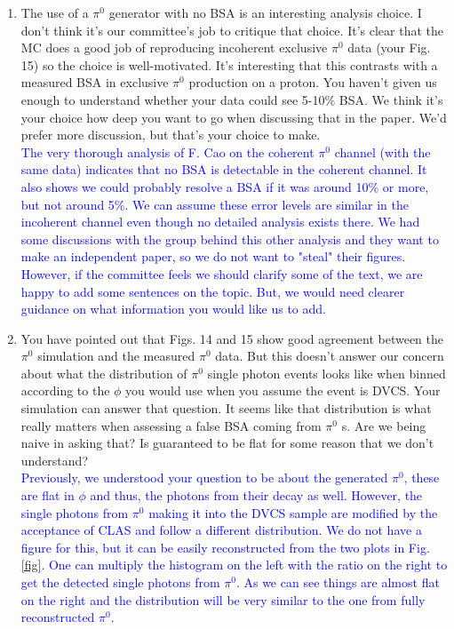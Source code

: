 \documentclass[a4paper,11pt,twoside]{article}
\begin{document}
\begin{enumerate}
\item The use of a $\pi^0$ generator with no BSA is an interesting analysis choice. I don't think it's our committee's job
to critique that choice. It's clear that the MC does a good job of reproducing incoherent exclusive $\pi^0$ data
(your Fig. 15) so the choice is well-motivated. It's interesting that this contrasts with a measured BSA in
exclusive $\pi^0$ production on a proton. You haven't given us enough to understand whether your data could
see 5-10\% BSA. We think it's your choice how deep you want to go when discussing that in the paper. We'd
prefer more discussion, but that's your choice to make. \\
   \textcolor{blue}{The very thorough analysis of F. Cao on the coherent $\pi^0$ channel (with the same data) indicates that no BSA is detectable in the coherent channel. It also shows we could probably resolve a BSA if it was around 10\% or more, but not around 5\%. We can assume these error levels are similar in the incoherent channel even though no detailed analysis exists there. We had some discussions with the group behind this other analysis and they want to make an independent paper, so we do not want to "steal" their figures. However, if the committee feels we should clarify some of the text, we are happy to add some sentences on the topic. But, we would need clearer guidance on what information you would like us to add.}
\item You have pointed out that Figs. 14 and 15 show good agreement between the $\pi^0$ simulation and the measured
$\pi^0$ data. But this doesn't answer our concern about what the distribution of $\pi^0$ single photon events looks
like when binned according to the $\phi$ you would use when you assume the event is DVCS. Your simulation
can answer that question. It seems like that distribution is what really matters when assessing a false BSA
coming from $\pi^0$ s. Are we being naive in asking that? Is guaranteed to be flat for some reason that we don't
understand? \\
   \textcolor{blue}{Previously, we understood your question to be about the generated $\pi^0$, these are flat in $\phi$ and thus, the photons from their decay as well. However, the single photons from $\pi^0$ making it into the DVCS sample are modified by the acceptance of CLAS and follow a different distribution. We do not have a figure for this, but it can be easily reconstructed from the two plots in Fig. \ref{fig}. One can multiply the histogram on the left with the ratio on the right to get the detected single photons from $\pi^0$. As we can see things are almost flat on the right and the distribution will be very similar to the one from fully reconstructed $\pi^0$.}

\end{enumerate}
\end{document}
